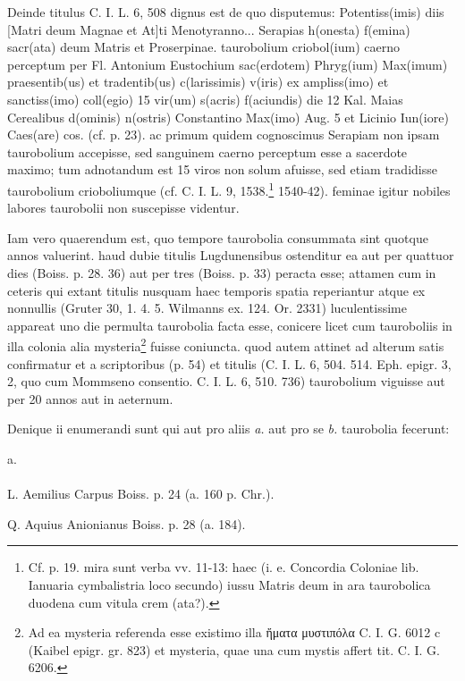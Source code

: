 \documentclass[a4paper, 11pt, oneside, polutonikogreek, german, twocolumn]{article}
\begin{document}
Deinde titulus C. I. L. 6, 508 dignus est de quo disputemus: Potentiss(imis) diis [Matri deum Magnae et At]ti Menotyranno... Serapias h(onesta) f(emina) sacr(ata) deum Matris et Proserpinae. taurobolium criobol(ium) caerno perceptum per Fl. Antonium Eustochium sac(erdotem) Phryg(ium) Max(imum) praesentib(us) et tradentib(us) c(larissimis) v(iris) ex ampliss(imo) et sanctiss(imo) coll(egio) 15 vir(um) s(acris) f(aciundis) die 12 Kal. Maias Cerealibus d(ominis) n(ostris) Constantino Max(imo) Aug. 5 et Licinio Iun(iore) Caes(are) cos. (cf. p. 23). ac primum quidem cognoscimus Serapiam non ipsam taurobolium accepisse, sed sanguinem caerno perceptum esse a sacerdote maximo; tum adnotandum est 15 viros non solum afuisse, sed etiam tradidisse taurobolium crioboliumque (cf. C. I. L. 9, 1538.\footnote{Cf. p. 19. mira sunt verba vv. 11-13: haec (i. e. Concordia Coloniae lib. Ianuaria cymbalistria loco secundo) iussu Matris deum in ara taurobolica duodena cum vitula crem (ata?).} 1540-42). feminae igitur nobiles labores taurobolii non suscepisse videntur.

Iam vero quaerendum est, quo tempore taurobolia consummata sint quotque annos valuerint. haud dubie titulis Lugdunensibus ostenditur ea aut per quattuor dies (Boiss. p. 28. 36) aut per tres (Boiss. p. 33) peracta esse; attamen cum in ceteris qui extant titulis nusquam haec temporis spatia reperiantur atque ex nonnullis (Gruter 30, 1. 4. 5. Wilmanns ex. 124. Or. 2331) luculentissime appareat uno die permulta taurobolia facta esse, conicere licet cum tauroboliis in illa colonia alia mysteria\footnote{Ad ea mysteria referenda esse existimo illa ἤματα μυστιπόλα C. I. G. 6012 c (Kaibel epigr. gr. 823) et mysteria, quae una cum mystis affert tit. C. I. G. 6206.} fuisse coniuncta. quod autem attinet ad alterum satis confirmatur et a scriptoribus (p. 54) et titulis (C. I. L. 6, 504. 514. Eph. epigr. 3, 2, quo cum Mommseno consentio. C. I. L. 6, 510. 736) taurobolium viguisse aut per 20 annos aut in aeternum.

Denique ii enumerandi sunt qui aut pro aliis \emph{a.} aut pro se \emph{b.} taurobolia fecerunt:
\begin{center}
a.
\end{center}
\paragraph{}
L. Aemilius Carpus Boiss. p. 24 (a. 160 p. Chr.).

Q. Aquius Anionianus Boiss. p. 28 (a. 184).
\end{document}

